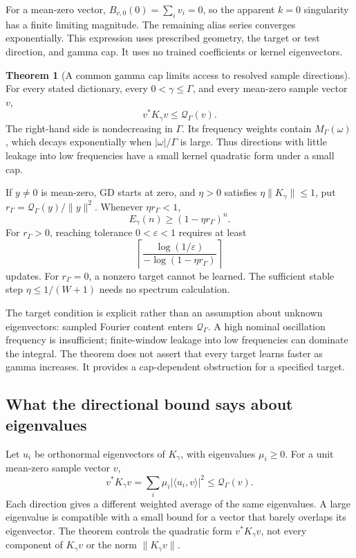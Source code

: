 \documentclass[11pt]{article}
\theoremstyle{definition}
\newtheorem{theorem}{Theorem}
\begin{document}
For a mean-zero vector, $B_{v,0}(0)=\sum_i v_i=0$, so the apparent
$k=0$ singularity has a finite limiting magnitude. The remaining alias
series converges exponentially. This expression uses prescribed geometry,
the target or test direction, and gamma cap. It uses no trained coefficients
or kernel eigenvectors.

\begin{theorem}[A common gamma cap limits access to resolved sample directions]
For every stated dictionary, every $0<\gamma\le\Gamma$, and every
mean-zero sample vector $v$,
\[
\boxed{v^*K_\gamma v\le\mathcal Q_\Gamma(v).}
\]
The right-hand side is nondecreasing in $\Gamma$. Its frequency weights
contain $M_\Gamma(\omega)$, which decays exponentially when
$|\omega|/\Gamma$ is large. Thus directions with little leakage into
low frequencies have a small kernel quadratic form under a small cap.

If $y\ne0$ is mean-zero, GD starts at zero, and $\eta>0$ satisfies
$\eta\|K_\gamma\|\le1$, put $r_\Gamma=\mathcal Q_\Gamma(y)/\|y\|^2$.
Whenever $\eta r_\Gamma<1$,
\[
E_\gamma(n)\ge(1-\eta r_\Gamma)^n.
\]
For $r_\Gamma>0$, reaching tolerance $0<\varepsilon<1$ requires at least
\[
\left\lceil\frac{\log(1/\varepsilon)}{-\log(1-\eta r_\Gamma)}\right\rceil
\]
updates. For $r_\Gamma=0$, a nonzero target cannot be learned.
The sufficient stable step $\eta\le1/(W+1)$ needs no spectrum calculation.
\end{theorem}
The target condition is explicit rather than an assumption about unknown
eigenvectors: sampled Fourier content enters $\mathcal Q_\Gamma$.
A high nominal oscillation frequency is insufficient; finite-window
leakage into low frequencies can dominate the integral. The theorem does
not assert that every target learns faster as gamma increases. It provides
a cap-dependent obstruction for a specified target.

\subsection*{What the directional bound says about eigenvalues}
Let $u_i$ be orthonormal eigenvectors of $K_\gamma$, with eigenvalues
$\mu_i\ge0$. For a unit mean-zero sample vector $v$,
\[
v^*K_\gamma v=\sum_i\mu_i|\langle u_i,v\rangle|^2
\le\mathcal Q_\Gamma(v).
\]
Each direction gives a different weighted average of the same eigenvalues.
A large eigenvalue is compatible with a small bound for a vector that
barely overlaps its eigenvector. The theorem controls the quadratic form
$v^*K_\gamma v$, not every component of $K_\gamma v$ or the norm
$\|K_\gamma v\|$.
\end{document}
